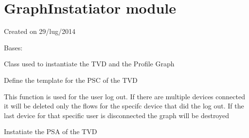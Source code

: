 \documentclass[letterpaper,10pt,oneside]{sphinxmanual}
\begin{document}
\chapter{GraphInstatiator module}
\label{GraphInstatiator:module-GraphInstatiator}\label{GraphInstatiator::doc}\label{GraphInstatiator:graphinstatiator-module}
Created on 29/lug/2014

\begin{fulllineitems}
\label{GraphInstatiator:GraphInstatiator.GraphInstantiator}
Bases: 

Class used to instantiate the TVD and the Profile Graph

\begin{fulllineitems}
\label{GraphInstatiator:GraphInstatiator.GraphInstantiator.definePSC}
Define the template for the PSC of the TVD

\end{fulllineitems}


\begin{fulllineitems}
\label{GraphInstatiator:GraphInstatiator.GraphInstantiator.deleteUser}
This function is used for the user log out. If there are multiple devices connected it will be deleted only the flows for the specifc device that did the log out.
If the last device for that specific user is disconnected the graph will be destroyed

\end{fulllineitems}


\begin{fulllineitems}
\label{GraphInstatiator:GraphInstatiator.GraphInstantiator.instantiatePSA}
Instatiate the PSA of the TVD

\end{fulllineitems}



\end{fulllineitems}
\end{document}
